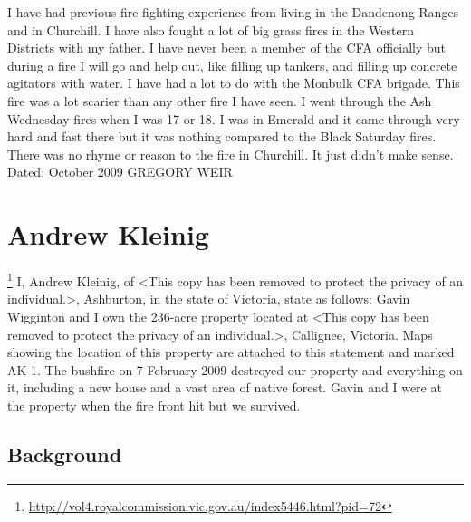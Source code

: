\documentclass[a4paper]{article}
\begin{document}
        I have had previous fire fighting experience from living in the Dandenong Ranges and in Churchill. I have also fought a lot of big grass fires in the Western Districts with my father.
        I have never been a member of the CFA officially but during a fire I will go and help out, like filling up tankers, and filling up concrete agitators with water. I have had a lot to do with the Monbulk CFA brigade.
        This fire was a lot scarier than any other fire I have seen. I went through the Ash Wednesday fires when I was 17 or 18. I was in Emerald and it came through very hard and fast there but it was nothing compared to the Black Saturday fires. There was no rhyme or reason to the fire in Churchill. It just didn't make sense.
        \newline
        \newline
        Dated: October 2009
        \newline
        \newline
        GREGORY WEIR

\section{Andrew Kleinig}

        \let\thefootnote\relax\footnote{\url{http://vol4.royalcommission.vic.gov.au/index5446.html?pid=72}}
        I, Andrew Kleinig, of <This copy has been removed to protect the privacy of an individual.>, Ashburton, in the state of Victoria, state as follows:
        Gavin Wigginton and I own the 236-acre property located at <This copy has been removed to protect the privacy of an individual.>, Callignee, Victoria. Maps showing the location of this property are attached to this statement and marked AK-1. The bushfire on 7 February 2009 destroyed our property and everything on it, including a new house and a vast area of native forest. Gavin and I were at the property when the fire front hit but we survived.

    \subsection{Background}
\end{document}
